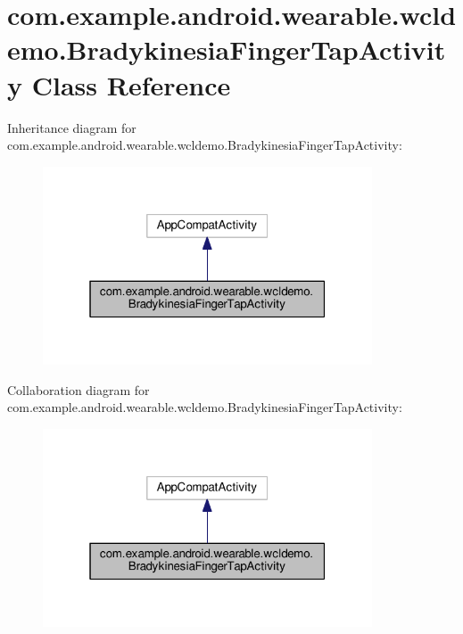 \hypertarget{classcom_1_1example_1_1android_1_1wearable_1_1wcldemo_1_1BradykinesiaFingerTapActivity}{}\section{com.\+example.\+android.\+wearable.\+wcldemo.\+Bradykinesia\+Finger\+Tap\+Activity Class Reference}
\label{classcom_1_1example_1_1android_1_1wearable_1_1wcldemo_1_1BradykinesiaFingerTapActivity}


Inheritance diagram for com.\+example.\+android.\+wearable.\+wcldemo.\+Bradykinesia\+Finger\+Tap\+Activity\+:
\nopagebreak
\begin{figure}[H]
\begin{center}
\leavevmode
\includegraphics[width=277pt]{d3/d92/classcom_1_1example_1_1android_1_1wearable_1_1wcldemo_1_1BradykinesiaFingerTapActivity__inherit__graph}
\end{center}
\end{figure}


Collaboration diagram for com.\+example.\+android.\+wearable.\+wcldemo.\+Bradykinesia\+Finger\+Tap\+Activity\+:
\nopagebreak
\begin{figure}[H]
\begin{center}
\leavevmode
\includegraphics[width=277pt]{d7/d21/classcom_1_1example_1_1android_1_1wearable_1_1wcldemo_1_1BradykinesiaFingerTapActivity__coll__graph}
\end{center}
\end{figure}
